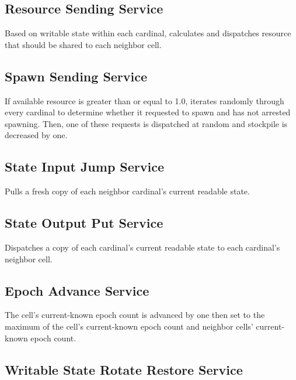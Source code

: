 \subsection{Resource Sending Service}


Based on writable state within each cardinal, calculates and dispatches resource that should be shared to each neighbor cell.

\subsection{Spawn Sending Service}


If available resource is greater than or equal to 1.0, iterates randomly through every cardinal to determine whether it requested to spawn and has not arrested spawning.
Then, one of these requests is dispatched at random and stockpile is decreased by one.

\subsection{State Input Jump Service}


Pulls a fresh copy of each neighbor cardinal's current readable state.

\subsection{State Output Put Service}


Dispatches a copy of each cardinal's current readable state to each cardinal's neighbor cell.

\subsection{Epoch Advance Service}


The cell's current-known epoch count is advanced by one then set to the maximum of the cell's current-known epoch count and neighbor cells' current-known epoch count.

\subsection{Writable State Rotate Restore Service}

